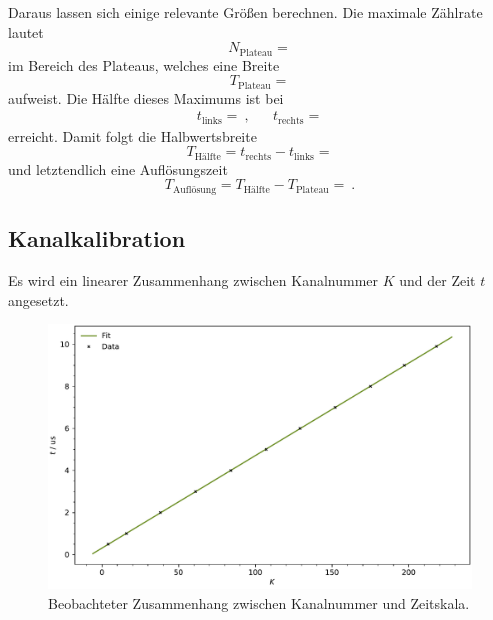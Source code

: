 Daraus lassen sich einige relevante Größen berechnen. Die maximale Zählrate lautet
\begin{equation*}
	N_\text{Plateau} = 
\end{equation*}
im Bereich des Plateaus, welches eine Breite
\begin{equation*}
	T_\text{Plateau} = 
\end{equation*}
aufweist. Die Hälfte dieses Maximums ist bei
\begin{align*}
	t_\text{links} =  \: , && t_\text{rechts} = 
\end{align*}
erreicht. Damit folgt die Halbwertsbreite
\begin{equation*}
	T_\text{Hälfte} = t_\text{rechts} - t_\text{links} = 
\end{equation*}
und letztendlich eine Auflösungszeit
\begin{equation*}
	T_\text{Auflösung} = T_\text{Hälfte} - T_\text{Plateau} =  \: .
\end{equation*}



\subsection{Kanalkalibration}

Es wird ein linearer Zusammenhang zwischen Kanalnummer $K$ und der Zeit $t$ angesetzt.

\begin{figure}[H]
	\centering
	\includegraphics[width=\textwidth]{build/calibration.pdf}
	\caption{Beobachteter Zusammenhang zwischen Kanalnummer und Zeitskala.}
	\label{fig:calibration}
\end{figure}

